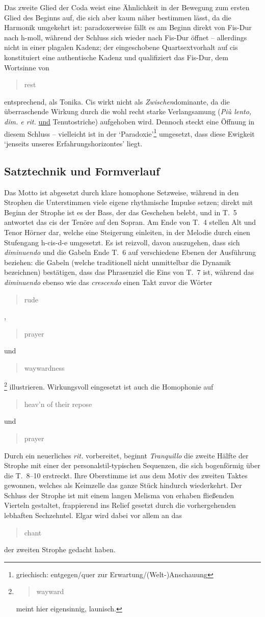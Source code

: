 \documentclass[a4paper,11pt,open=any]{scrbook}
\newcommand{\engquote}[1]{\foreignblockquote{english}{#1}}
\begin{document}
Das zweite Glied der Coda weist eine Ähnlichkeit in der Bewegung zum
ersten Glied des Beginns auf, die sich aber kaum näher bestimmen lässt,
da die Harmonik umgekehrt ist: paradoxerweise fällt es am Beginn direkt
von Fis-Dur nach h-moll, während der Schluss sich wieder nach Fis-Dur
öffnet – allerdings nicht in einer plagalen Kadenz; der eingeschobene
Quartsextvorhalt auf \textsf{cis} konstituiert eine authentische
Kadenz und qualifiziert das Fis-Dur, dem Wortsinne von \engquote{rest}
entsprechend, als Tonika.  \textsf{Cis} wirkt nicht als
\textit{Zwischen}dominante, da die überraschende Wirkung durch
die wohl recht starke Verlangsamung (\textit{Più lento, dim. e
rit.} \underline{und} Tenutostriche) aufgehoben wird.  Dennoch
steckt eine Öffnung in diesem Schluss – vielleicht ist in der
\enquote*{Paradoxie}\footnote{griechisch: entgegen/quer zur
Erwartung/(Welt-)Anschauung} umgesetzt, dass diese Ewigkeit
\enquote*{jenseits unseres Erfahrungshorizontes} liegt.

\subsection*{Satztechnik und Formverlauf}
Das Motto ist abgesetzt durch klare homophone Setzweise, während in den
Strophen die Unterstimmen viele eigene rhythmische Impulse setzen; direkt
mit Beginn der Strophe ist es der Bass, der das Geschehen belebt, und in
T.~5 antwortet das \textsf{cis} der Tenöre auf den Sopran.  Am Ende von
T.~4 stellen Alt und Tenor Hörner dar, welche eine Steigerung einleiten,
in der Melodie durch einen Stufengang \mbox{\textsf{h-cis-d-e}} umgesetzt.
Es ist reizvoll, davon auszugehen, dass sich \textit{diminuendo} und die
Gabeln Ende T.~6 auf verschiedene Ebenen der Ausführung beziehen: die
Gabeln (welche traditionell nicht unmittelbar die Dynamik bezeichnen\cite
[Kapitel 1]{poli}) bestätigen, dass das Phrasenziel die Eins von T.~7
ist, während das \textit{diminuendo} ebenso wie das \textit{crescendo}
einen Takt zuvor die Wörter \engquote{rude}, \engquote{prayer} und
\engquote{waywardness}\footnote{\engquote{wayward} meint hier eigensinnig,
launisch.} illustrieren.  Wirkungsvoll eingesetzt ist auch die Homophonie
auf \engquote{heav’n of their repose} und \engquote{prayer}.

Durch ein neuerliches \textit{rit.} vorbereitet, beginnt \textit{Tranquillo}
die zweite Hälfte der Strophe mit einer der personalstil-typischen Sequenzen,
die sich bogenförmig über die T.~8–10 erstreckt.  Ihre Oberstimme ist aus dem
Motiv des zweiten Taktes gewonnen, welches als Keimzelle das ganze Stück
hindurch wiederkehrt.  Der Schluss der Strophe ist mit einem langen Melisma
von erhaben fließenden Vierteln gestaltet, frappierend ins Relief gesetzt
durch die vorhergehenden lebhaften Sechzehntel.  Elgar wird dabei vor allem
an das \engquote{chant} der zweiten Strophe gedacht haben.
\end{document}
